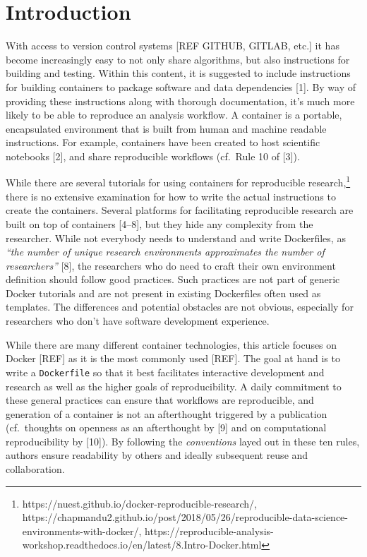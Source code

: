 \documentclass[10pt,letterpaper]{article}
\begin{document}
\linenumbers

\hypertarget{introduction}{%
\section*{Introduction}\label{introduction}}

With access to version control systems {[}REF GITHUB, GITLAB, etc.{]} it
has become increasingly easy to not only share algorithms, but also
instructions for building and testing. Within this content, it is
suggested to include instructions for building containers to package
software and data dependencies {[}1{]}. By way of providing these
instructions along with thorough documentation, it's much more likely to
be able to reproduce an analysis workflow. A container is a portable,
encapsulated environment that is built from human and machine readable
instructions. For example, containers have been created to host
scientific notebooks {[}2{]}, and share reproducible workflows (cf.~Rule
10 of {[}3{]}).

While there are several tutorials for using containers for reproducible
research,\footnote{https://nuest.github.io/docker-reproducible-research/,
  https://chapmandu2.github.io/post/2018/05/26/reproducible-data-science-environments-with-docker/,
  https://reproducible-analysis-workshop.readthedocs.io/en/latest/8.Intro-Docker.html}
there is no extensive examination for how to write the actual
instructions to create the containers. Several platforms for
facilitating reproducible research are built on top of containers
{[}4--8{]}, but they hide any complexity from the researcher. While not
everybody needs to understand and write Dockerfiles, as \emph{``the
number of unique research environments approximates the number of
researchers''} {[}8{]}, the researchers who do need to craft their own
environment definition should follow good practices. Such practices are
not part of generic Docker tutorials and are not present in existing
Dockerfiles often used as templates. The differences and potential
obstacles are not obvious, especially for researchers who don't have
software development experience.

While there are many different container technologies, this article
focuses on Docker {[}REF{]} as it is the most commonly used {[}REF{]}.
The goal at hand is to write a \texttt{Dockerfile} so that it best
facilitates interactive development and research as well as the higher
goals of reproducibility. A daily commitment to these general practices
can ensure that workflows are reproducible, and generation of a
container is not an afterthought triggered by a publication
(cf.~thoughts on openness as an afterthought by {[}9{]} and on
computational reproducibility by {[}10{]}). By following the
\emph{conventions} layed out in these ten rules, authors ensure
readability by others and ideally subsequent reuse and collaboration.
\end{document}
